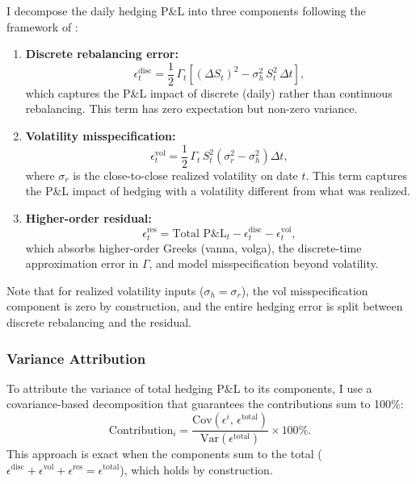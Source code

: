 \documentclass[12pt, letterpaper]{article}
\newcommand{\Var}{\text{Var}}
\newcommand{\Cov}{\text{Cov}}
\begin{document}
I decompose the daily hedging P\&L into three components following the framework of \citet{ElKaroui1998}:

\begin{enumerate}
    \item \textbf{Discrete rebalancing error:}
    \begin{equation}
        \epsilon_t^{\text{disc}} = \frac{1}{2}\,\Gamma_t\left[(\Delta S_t)^2 - \sigma_h^2\, S_t^2\,\Delta t\right],
        \label{eq:discrete_err}
    \end{equation}
    which captures the P\&L impact of discrete (daily) rather than continuous rebalancing. This term has zero expectation but non-zero variance.

    \item \textbf{Volatility misspecification:}
    \begin{equation}
        \epsilon_t^{\text{vol}} = \frac{1}{2}\,\Gamma_t\, S_t^2\left(\sigma_r^2 - \sigma_h^2\right)\Delta t,
        \label{eq:vol_misspec}
    \end{equation}
    where $\sigma_r$ is the close-to-close realized volatility on date $t$. This term captures the P\&L impact of hedging with a volatility different from what was realized.

    \item \textbf{Higher-order residual:}
    \begin{equation}
        \epsilon_t^{\text{res}} = \text{Total P\&L}_t - \epsilon_t^{\text{disc}} - \epsilon_t^{\text{vol}},
        \label{eq:residual}
    \end{equation}
    which absorbs higher-order Greeks (vanna, volga), the discrete-time approximation error in $\Gamma$, and model misspecification beyond volatility.
\end{enumerate}

Note that for realized volatility inputs ($\sigma_h = \sigma_r$), the vol misspecification component is zero by construction, and the entire hedging error is split between discrete rebalancing and the residual.

\subsubsection{Variance Attribution}

To attribute the variance of total hedging P\&L to its components, I use a covariance-based decomposition that guarantees the contributions sum to 100\%:
\begin{equation}
    \text{Contribution}_i = \frac{\Cov(\epsilon^i, \, \epsilon^{\text{total}})}{\Var(\epsilon^{\text{total}})} \times 100\%.
    \label{eq:cov_decomp}
\end{equation}
This approach is exact when the components sum to the total ($\epsilon^{\text{disc}} + \epsilon^{\text{vol}} + \epsilon^{\text{res}} = \epsilon^{\text{total}}$), which holds by construction.
\end{document}
